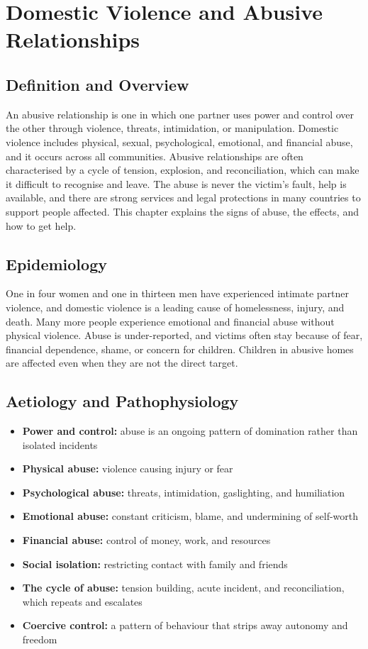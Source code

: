 \chapter{Domestic Violence and Abusive Relationships}

\section*{Definition and Overview}
An abusive relationship is one in which one partner uses power and control over the other through violence, threats, intimidation, or manipulation. Domestic violence includes physical, sexual, psychological, emotional, and financial abuse, and it occurs across all communities. Abusive relationships are often characterised by a cycle of tension, explosion, and reconciliation, which can make it difficult to recognise and leave. The abuse is never the victim's fault, help is available, and there are strong services and legal protections in many countries to support people affected. This chapter explains the signs of abuse, the effects, and how to get help.

\section*{Epidemiology}
One in four women and one in thirteen men have experienced intimate partner violence, and domestic violence is a leading cause of homelessness, injury, and death. Many more people experience emotional and financial abuse without physical violence. Abuse is under-reported, and victims often stay because of fear, financial dependence, shame, or concern for children. Children in abusive homes are affected even when they are not the direct target.

\section*{Aetiology and Pathophysiology}
\begin{itemize}
    \item \textbf{Power and control:} abuse is an ongoing pattern of domination rather than isolated incidents
    \item \textbf{Physical abuse:} violence causing injury or fear
    \item \textbf{Psychological abuse:} threats, intimidation, gaslighting, and humiliation
    \item \textbf{Emotional abuse:} constant criticism, blame, and undermining of self-worth
    \item \textbf{Financial abuse:} control of money, work, and resources
    \item \textbf{Social isolation:} restricting contact with family and friends
    \item \textbf{The cycle of abuse:} tension building, acute incident, and reconciliation, which repeats and escalates
    \item \textbf{Coercive control:} a pattern of behaviour that strips away autonomy and freedom
\end{itemize}

